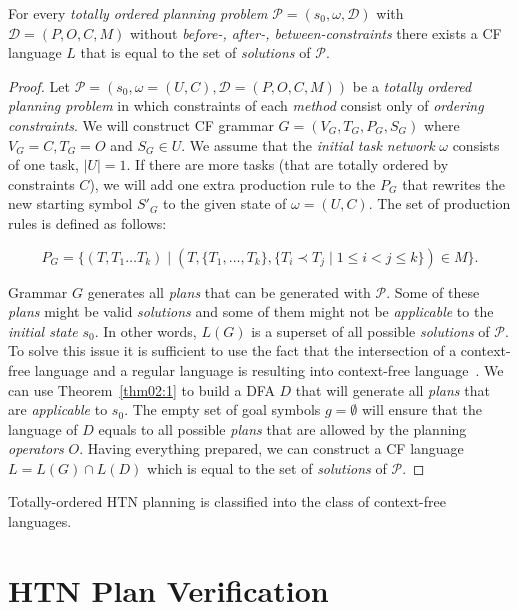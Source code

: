 \begin{thm}\label{thm02:4}
    For every \emph{totally ordered planning problem} $\mathcal{P} = (s_0,\omega,\mathcal{D})$ with $\mathcal{D}=(P, O, C, M)$ without \emph{before-, after-, between-constraints} there exists a CF language $L$ that is equal to the set of \emph{solutions} of $\mathcal{P}$.
\end{thm}
\begin{proof}
    Let $\mathcal{P} = (s_0,\omega = (U, C), \mathcal{D} = (P, O, C, M))$ be a \emph{totally ordered planning problem} in which constraints of each \emph{method} consist only of \emph{ordering constraints}. We will construct CF grammar $G = (V_G, T_G, P_G, S_G)$ where $V_G = C, T_G = O$ and $S_G \in U$. We assume that the \emph{initial task network} $\omega$ consists of one task, $|U| = 1$. If there are more tasks (that are totally ordered by constraints $C$), we will add one extra production rule to the $P_G$ that rewrites the new starting symbol $S'_G$ to the given state of $\omega = (U, C)$. The set of production rules is defined as follows:
    
    \[
    P_G = \{(T, T_1\dots T_k) \; | \; (T, \{T_1, \dots, T_k\}, \{T_i \prec T_j \; | \; 1 \leq i < j \leq k\}) \in M\}.
    \]

    Grammar $G$ generates all \emph{plans} that can be generated with $\mathcal{P}$. Some of these \emph{plans} might be valid \emph{solutions} and some of them might not be \emph{applicable} to the \emph{initial state} $s_0$. In other words, $L(G)$ is a superset of all possible \emph{solutions} of $\mathcal{P}$. To solve this issue it is sufficient to use the fact that the intersection of a context-free language and a regular language is resulting into context-free language~\cite{chytil}. We can use Theorem~\ref{thm02:1} to build a DFA $D$ that will generate all \emph{plans} that are \emph{applicable} to $s_0$. The empty set of goal symbols $g = \emptyset$ will ensure that the language of $D$ equals to all possible \emph{plans} that are allowed by the planning \emph{operators} $O$. Having everything prepared, we can construct a CF language $L = L(G) \cap L(D)$ which is equal to the set of \emph{solutions} of $\mathcal{P}$.
\end{proof}

\begin{cor}\label{cor2:2}
Totally-ordered HTN planning is classified into the class of context-free languages.
\end{cor}

\section{HTN Plan Verification}


